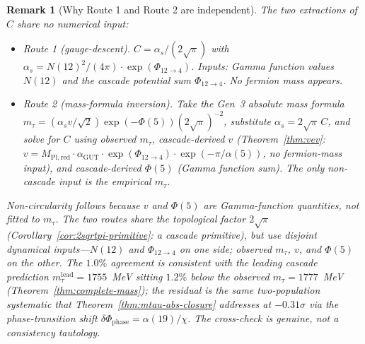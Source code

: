 \documentclass[12pt,a4paper]{article}
\newtheorem*{remark}{Remark}
\begin{document}
\begin{remark}[Why Route 1 and Route 2 are independent]\label{rem:sp34-status}
The two extractions of $C$ share no numerical input:
\begin{itemize}
\item \emph{Route 1 (gauge-descent).} $C = \alpha_s/(2\sqrt{\pi})$ with
$\alpha_s = N(12)^2/(4\pi) \cdot \exp(\Phi_{12\to 4})$. Inputs: Gamma
function values $N(12)$ and the cascade potential sum $\Phi_{12\to 4}$.
No fermion mass appears.
\item \emph{Route 2 (mass-formula inversion).} Take the Gen~3 absolute
mass formula $m_\tau = (\alpha_s v/\sqrt{2})\exp(-\Phi(5))(2\sqrt{\pi})^{-2}$,
substitute $\alpha_s = 2\sqrt{\pi}\,C$, and solve for $C$ using
\emph{observed} $m_\tau$, \emph{cascade-derived} $v$ (Theorem~\ref{thm:vev}:
$v = M_{\mathrm{Pl,red}}\cdot\alpha_{\mathrm{GUT}}\cdot\exp(\Phi_{12\to 4})
\cdot\exp(-\pi/\alpha(5))$, no fermion-mass input), and
\emph{cascade-derived} $\Phi(5)$ (Gamma function sum). The only
non-cascade input is the empirical $m_\tau$.
\end{itemize}
Non-circularity follows because $v$ and $\Phi(5)$ are Gamma-function
quantities, not fitted to $m_\tau$. The two routes share the topological
factor $2\sqrt{\pi}$ (Corollary~\ref{cor:2sqrtpi-primitive}: a cascade
primitive), but use disjoint dynamical inputs---$N(12)$ and
$\Phi_{12\to 4}$ on one side; observed $m_\tau$, $v$, and $\Phi(5)$ on
the other. The $1.0\%$ agreement is consistent with the leading
cascade prediction $m_\tau^{\mathrm{lead}} = 1755$~MeV sitting $1.2\%$
below the observed $m_\tau = 1777$~MeV (Theorem~\ref{thm:complete-mass});
the residual is the same two-population systematic that
Theorem~\ref{thm:mtau-abs-closure} addresses at $-0.31\sigma$ via the
phase-transition shift $\delta\Phi_{\mathrm{phase}} = \alpha(19)/\chi$.
The cross-check is genuine, not a consistency tautology.
\end{remark}
\end{document}
